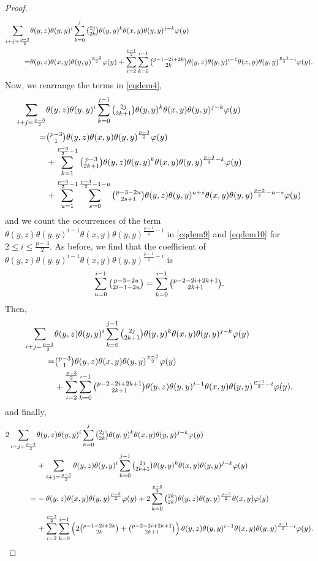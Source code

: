 \documentclass[11pt, twoside]{article}
\begin{document}
\begin{proof}
\begin{align*}
         \sum\limits_{i+j=\frac{p-3}{2}}&\theta(y,z)\theta(y,y)^i\sum\limits_{k=0}^j\tbinom{2j}{2k}\theta(y,y)^k\theta(x,y)\theta(y,y)^{j-k}\varphi(y)\\ =& \theta(y,z)\theta(x,y)\theta(y,y)^\frac{p-3}{2}\varphi(y) + \sum\limits_{i=2}^\frac{p-1}{2}\sum\limits_{k=0}^{i-1}\tbinom{p-1-2i+2k}{2k}\theta(y,z)\theta(y,y)^{i-1}\theta(x,y)\theta(y,y)^{\frac{p-1}{2}-i}\varphi(y).
    \end{align*} Now, we rearrange the terms in \eqref{eqdem4}, \begin{align}
         \sum\limits_{i+j=\frac{p-3}{2}}&\theta(y,z)\theta(y,y)^i\sum\limits_{k=0}^{j-1}\tbinom{2j}{2k+1}\theta(y,y)^k\theta(x,y)\theta(y,y)^{j-k}\varphi(y)\notag \\ =& \tbinom{p-3}{1}\theta(y,z)\theta(x,y)\theta(y,y)^{\frac{p-3}{2}}\varphi(y) \notag \\ &+\sum\limits_{k=1}^{\frac{p-3}{2}-1}\tbinom{p-3}{2k+1}\theta(y,z)\theta(y,y)^k\theta(x,y)\theta(y,y)^{\frac{p-3}{2}-k}\varphi(y) \label{eqdem9}\\ &+ \sum\limits_{u=1}^{\frac{p-3}{2}-1}\sum\limits_{s=0}^{\frac{p-3}{2}-1-u}\tbinom{p-3-2u}{2s+1}\theta(y,z)\theta(y,y)^{u+s}\theta(x,y)\theta(y,y)^{\frac{p-3}{2}-u-s}\varphi(y)\label{eqdem10}
    \end{align} and we count the occurrences of the term $\theta(y,z)\theta(y,y)^{i-1}\theta(x,y)\theta(y,y)^{\frac{p-1}{2}-i} $ in \eqref{eqdem9} and \eqref{eqdem10} for $2\leq i\leq \frac{p-3}{2} $. As before, we find that the coefficient of $\theta(y,z)\theta(y,y)^{i-1}\theta(x,y)\theta(y,y)^{\frac{p-1}{2}-i} $ is \begin{align*}
        \sum\limits_{u=0}^{i-1}\tbinom{p-3-2u}{2i-1-2u}= \sum\limits_{k=0}^{i-1}\tbinom{p-2-2i+2k+1}{2k+1}.
    \end{align*} Then, \begin{align*}
        \sum\limits_{i+j=\frac{p-3}{2}}&\theta(y,z)\theta(y,y)^i\sum\limits_{k=0}^{j-1}\tbinom{2j}{2k+1}\theta(y,y)^k\theta(x,y)\theta(y,y)^{j-k}\varphi(y)\\ = &\tbinom{p-3}{1}\theta(y,z)\theta(x,y)\theta(y,y)^{\frac{p-3}{2}}\varphi(y) \\&+ \sum\limits_{i=2}^\frac{p-3}{2}\sum\limits_{k=0}^{i-1}\tbinom{p-2-2i+2k+1}{2k+1}\theta(y,z)\theta(y,y)^{i-1}\theta(x,y)\theta(y,y)^{\frac{p-1}{2}-i}\varphi(y),
    \end{align*} and finally, \begin{align*}
        2\sum\limits_{i+j=\frac{p-3}{2}}&\theta(y,z)\theta(y,y)^i\sum\limits_{k=0}^j\tbinom{2j}{2k}\theta(y,y)^k\theta(x,y)\theta(y,y)^{j-k}\varphi(y) \\& + \sum\limits_{i+j=\frac{p-3}{2}}\theta(y,z)\theta(y,y)^i\sum\limits_{k=0}^{j-1}\tbinom{2j}{2k+1}\theta(y,y)^k\theta(x,y)\theta(y,y)^{j-k}\varphi(y)\\ =& -\theta(y,z)\theta(x,y)\theta(y,y)^\frac{p-3}{2}\varphi(y)+ 2\sum\limits_{k=0}^{\frac{p-3}{2}}\tbinom{2k}{2k}\theta(y,z)\theta(y,y)^{\frac{p-3}{2}}\theta(x,y)\varphi(y) \\&+ \sum\limits_{i=2}^\frac{p-3}{2}\sum\limits_{k=0}^{i-1}\left(2\tbinom{p-1-2i+2k}{2k}+\tbinom{p-2-2i+2k+1}{2k+1}\right)\theta(y,z)\theta(y,y)^{i-1}\theta(x,y)\theta(y,y)^{\frac{p-1}{2}-i}\varphi(y).

\end{align*}
\end{proof}
\end{document}
